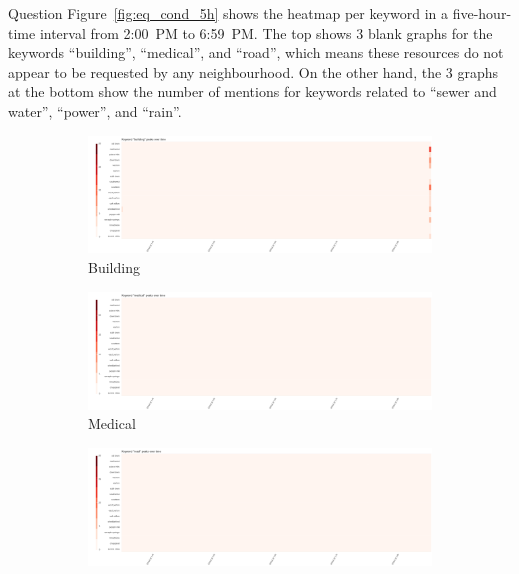 \documentclass{article}
\begin{document}
\begin{section}{Question}
Figure~\ref{fig:eq_cond_5h} shows the heatmap per keyword in a five-hour-time 
interval from 2:00~PM to 6:59~PM. The top shows 3 blank graphs for the keywords
``building'', ``medical'', and ``road'', which means these resources do not 
appear to be requested by any neighbourhood. On the other hand, the 3 graphs at
the bottom show the number of mentions for keywords related to 
``sewer and water'', ``power'', and ``rain''. 

\begin{figure}[!h]
    \centering
    \begin{subfigure}[!h]{0.32\textwidth}
        \centering
        \includegraphics[width=1.00\textwidth]{figs/cond_5h/cond_5h_build.png}
        \caption{Building}
    \end{subfigure}
    \begin{subfigure}[!h]{0.32\textwidth}
        \centering
        \includegraphics[width=1.00\textwidth]{figs/cond_5h/cond_5h_medical.png}
        \caption{Medical}
    \end{subfigure}
    \begin{subfigure}[!h]{0.32\textwidth}
        \centering
        \includegraphics[width=1.00\textwidth]{figs/cond_5h/cond_5h_road.png}

\end{subfigure}
\end{figure}
\end{section}
\end{document}
